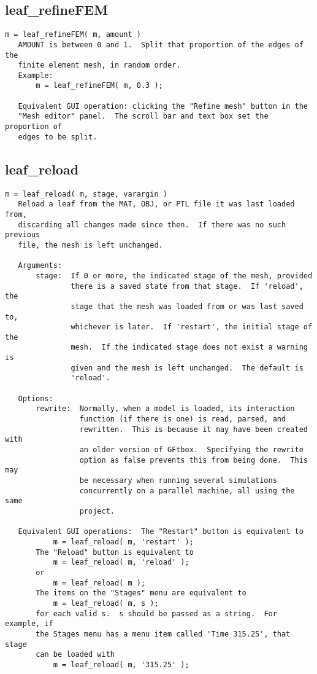 \subsection{leaf\_refineFEM}\label{section-leaf-refineFEM}

\begin{verbatim}
m = leaf_refineFEM( m, amount )
   AMOUNT is between 0 and 1.  Split that proportion of the edges of the
   finite element mesh, in random order.
   Example:
       m = leaf_refineFEM( m, 0.3 );

   Equivalent GUI operation: clicking the "Refine mesh" button in the
   "Mesh editor" panel.  The scroll bar and text box set the proportion of
   edges to be split.
\end{verbatim}

\subsection{leaf\_reload}\label{section-leaf-reload}

\begin{verbatim}
m = leaf_reload( m, stage, varargin )
   Reload a leaf from the MAT, OBJ, or PTL file it was last loaded from,
   discarding all changes made since then.  If there was no such previous
   file, the mesh is left unchanged.

   Arguments:
       stage:  If 0 or more, the indicated stage of the mesh, provided
               there is a saved state from that stage.  If 'reload', the
               stage that the mesh was loaded from or was last saved to,
               whichever is later.  If 'restart', the initial stage of the
               mesh.  If the indicated stage does not exist a warning is
               given and the mesh is left unchanged.  The default is
               'reload'.

   Options:
       rewrite:  Normally, when a model is loaded, its interaction
                 function (if there is one) is read, parsed, and
                 rewritten.  This is because it may have been created with
                 an older version of GFtbox.  Specifying the rewrite
                 option as false prevents this from being done.  This may
                 be necessary when running several simulations
                 concurrently on a parallel machine, all using the same
                 project.

   Equivalent GUI operations:  The "Restart" button is equivalent to
           m = leaf_reload( m, 'restart' );
       The "Reload" button is equivalent to
           m = leaf_reload( m, 'reload' );
       or
           m = leaf_reload( m );
       The items on the "Stages" menu are equivalent to
           m = leaf_reload( m, s );
       for each valid s.  s should be passed as a string.  For example, if
       the Stages menu has a menu item called 'Time 315.25', that stage
       can be loaded with
           m = leaf_reload( m, '315.25' );
\end{verbatim}

